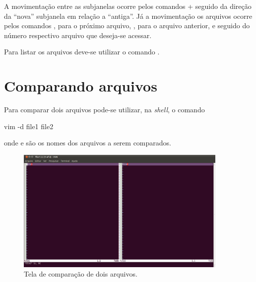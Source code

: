 A movimentação entre as subjanelas ocorre pelos comandos + seguido da direção da ``nova'' subjanela em relação a ``antiga''. Já a movimentação os arquivos ocorre pelos comandos , para o próximo arquivo, , para o arquivo anterior, e  seguido do número respectivo arquivo que deseja-se acessar.

Para listar os arquivos deve-se utilizar o comando .

\section{Comparando arquivos}
Para comparar dois arquivos pode-se utilizar, na \textit{shell}, o comando
\begin{code}
    vim -d file1 file2
\end{code}
onde  e  são os nomes dos arquivos a serem comparados.
\begin{figure}[h!]
    \centering
    \includegraphics[height=6cm]{figures/vim_diff_screen}
    \caption{Tela de comparação de dois arquivos.}
    \label{fig:vim_diff_screen}
\end{figure}
